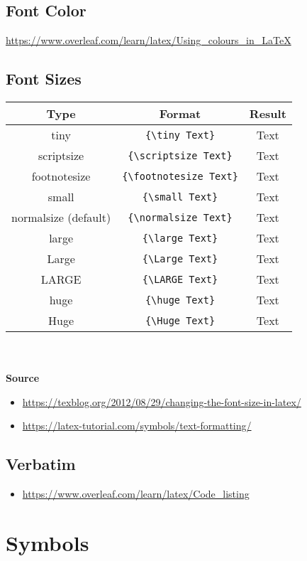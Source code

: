 \documentclass[10pt, letterpaper]{article}
\begin{document}
\subsection{Font Color}
\url{https://www.overleaf.com/learn/latex/Using_colours_in_LaTeX}

\subsection{Font Sizes}
\begin{tabular}{c c c}
    Type & Format & Result\\
    \hline
    tiny & \verb|{\tiny Text}| & {\tiny Text}\\
    scriptsize & \verb|{\scriptsize Text}| & {\scriptsize Text}\\
    footnotesize & \verb|{\footnotesize Text}| & {\footnotesize Text}\\
    small & \verb|{\small Text}| & {\small Text}\\
    normalsize (default) & \verb|{\normalsize Text}| & {\normalsize Text}\\
    large & \verb|{\large Text}| & {\large Text}\\
    Large & \verb|{\Large Text}| & {\Large Text}\\
    LARGE & \verb|{\LARGE Text}| & {\LARGE Text}\\
    huge & \verb|{\huge Text}| & {\huge Text}\\
    Huge & \verb|{\Huge Text}| & {\Huge Text}\\
\end{tabular}\\
\\
\textbf{Source}
\begin{itemize}
  \item \url{https://texblog.org/2012/08/29/changing-the-font-size-in-latex/}
  \item \url{https://latex-tutorial.com/symbols/text-formatting/}
\end{itemize}

\subsection{Verbatim}
\begin{itemize}
  \item \url{https://www.overleaf.com/learn/latex/Code_listing}
\end{itemize}


\section{Symbols}
\end{document}
